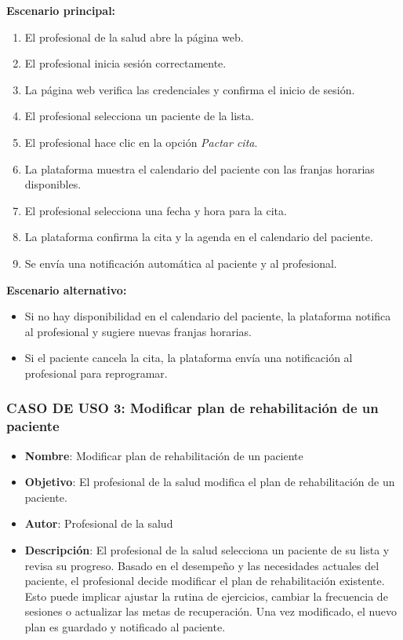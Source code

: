 \documentclass{article}
\begin{document}
\textbf{Escenario principal:}
\begin{enumerate}
	\item El profesional de la salud abre la página web.
	\item El profesional inicia sesión correctamente.
	\item La página web verifica las credenciales y confirma el inicio de sesión.
	\item El profesional selecciona un paciente de la lista.
	\item El profesional hace clic en la opción \textit{Pactar cita}.
	\item La plataforma muestra el calendario del paciente con las franjas horarias disponibles.
	\item El profesional selecciona una fecha y hora para la cita.
	\item La plataforma confirma la cita y la agenda en el calendario del paciente.
	\item Se envía una notificación automática al paciente y al profesional.
\end{enumerate}

\textbf{Escenario alternativo:}
\begin{itemize}
	\item Si no hay disponibilidad en el calendario del paciente, la plataforma notifica al profesional y sugiere nuevas franjas horarias.
	\item Si el paciente cancela la cita, la plataforma envía una notificación al profesional para reprogramar.
\end{itemize}

\subsubsection*{CASO DE USO 3: Modificar plan de rehabilitación de un paciente}

\begin{itemize}
	\item \textbf{Nombre}: Modificar plan de rehabilitación de un paciente
	\item \textbf{Objetivo}: El profesional de la salud modifica el plan de rehabilitación de un paciente.
	\item \textbf{Autor}: Profesional de la salud
	\item \textbf{Descripción}: 
	El profesional de la salud selecciona un paciente de su lista y revisa su progreso. Basado en el desempeño y las necesidades actuales del paciente, el profesional decide modificar el plan de rehabilitación existente. Esto puede implicar ajustar la rutina de ejercicios, cambiar la frecuencia de sesiones o actualizar las metas de recuperación. Una vez modificado, el nuevo plan es guardado y notificado al paciente.
\end{itemize}
\end{document}
